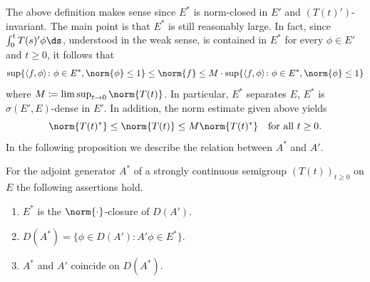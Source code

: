 The above definition makes sense since $E^{*}$ is norm-closed in $E'$ and $(T(t)')$-invariant.
The main point is that $E^{*}$ is still reasonably large.
In fact, since $\int_{0}^{t} T(s)'\phi  \ds$, understood in the weak sense, is contained in $E^{*}$ for every $\phi \in E'$ and $t \geq 0$, it follows that
\[
    \sup\{\langle f,\phi \rangle \colon \phi \in E^{*}, \norm{\phi} \leq 1\} \leq \norm{f} \leq M\cdot\sup\{\langle f,\phi \rangle \colon \phi \in E^{*}, \norm{\phi} \leq1\}
\]
where $M \coloneqq \lim\sup_{t \to 0} \norm{T(t)}$.
In particular, $E^{*}$ separates $E$, \ie $E^{*}$ is $\sigma(E',E)$-dense in $E'$.
In addition, the norm estimate given above yields
\[
    \norm{T(t)^{*}} \leq \norm{T(t)} \leq M\norm{T(t)^{*}} \quad \text{for all } t \geq 0.
\]
In the following proposition we describe the relation between $A^{*}$ and $A'$.
\begin{proposition*}\label{prop:a1-3.4}
For the adjoint generator $A^{*}$ of a strongly continuous semigroup $(T(t))_{t \geq 0}$ on $E$ the following assertions hold.
\begin{enumerate}[\upshape(i)]
\item 
$E^{*}$ is the $\norm{\cdot}$-closure of\/ $D(A')$.

\item 
$D(A^{*}) = \{\phi \in D(A') \colon A'\phi \in E^{*}\}$.

\item 
$A^{*}$ and $A'$ coincide on $D(A^{*})$.
\end{enumerate}
\end{proposition*}
